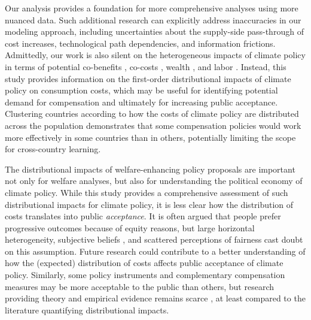 \documentclass[12pt, a4paper]{article}
\begin{document}
Our analysis provides a foundation for more comprehensive analyses using more nuanced data. Such additional research can explicitly address inaccuracies in our modeling approach, including uncertainties about the supply-side pass-through of cost increases, technological path dependencies, and information frictions. Admittedly, our work is also silent on the heterogeneous impacts of climate policy in terms of potential co-benefits \autocite[e.g.,][]{Holland.2019,Karlsson.2020}, co-costs \autocite[e.g.,][]{Fuje.2019,Greve.2022}, wealth \autocite[e.g.,][]{Fullerton.2011}, and labor \autocite[e.g.,][]{Castellanos.2024}. Instead, this study provides information on the first-order distributional impacts of climate policy on consumption costs, which may be useful for identifying potential demand for compensation and ultimately for increasing public acceptance. Clustering countries according to how the costs of climate policy are distributed across the population demonstrates that some compensation policies would work more effectively in some countries than in others, potentially limiting the scope for cross-country learning. %

The distributional impacts of welfare-enhancing policy proposals are important not only for welfare analyses, but also for understanding the political economy of climate policy. While this study provides a comprehensive assessment of such distributional impacts for climate policy, it is less clear how the distribution of costs translates into public \textit{acceptance}. It is often argued that people prefer progressive outcomes because of equity reasons, but large horizontal heterogeneity, subjective beliefs \autocite{Douenne.2020}, and scattered perceptions of fairness \autocite{MaestreAndres.2019,Povitkina.2021} cast doubt on this assumption. Future research could contribute to a better understanding of how the (expected) distribution of costs affects public acceptance of climate policy. Similarly, some policy instruments and complementary compensation measures may be more acceptable to the public than others, but research providing theory and empirical evidence remains scarce \autocite[e.g.,][]{Sommer.2022,Valencia.2023}, at least compared to the literature quantifying distributional impacts. 
\end{document}
